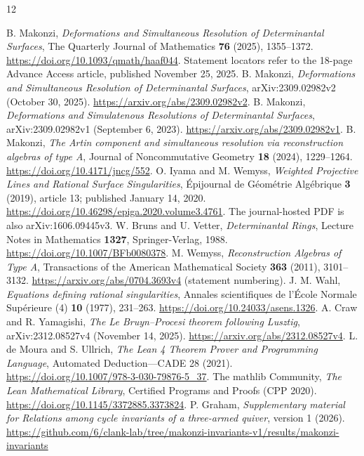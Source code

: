 \documentclass[11pt]{article}
\theoremstyle{remark}
\begin{document}
\begin{thebibliography}{12}
\small\raggedright
{}
B. Makonzi, \emph{Deformations and Simultaneous Resolution of Determinantal
Surfaces}, The Quarterly Journal of Mathematics \textbf{76} (2025),
1355--1372. \url{https://doi.org/10.1093/qmath/haaf044}.
Statement locators refer to the 18-page Advance Access article,
published November 25, 2025.
B. Makonzi, \emph{Deformations and Simultaneous Resolution of Determinantal
Surfaces}, arXiv:2309.02982v2 (October 30, 2025).
\url{https://arxiv.org/abs/2309.02982v2}.
B. Makonzi, \emph{Deformations and Simulatenous Resolutions of Determinantal
Surfaces}, arXiv:2309.02982v1 (September 6, 2023).
\url{https://arxiv.org/abs/2309.02982v1}.
B. Makonzi, \emph{The Artin component and simultaneous resolution via
reconstruction algebras of type A}, Journal of Noncommutative Geometry
\textbf{18} (2024), 1229--1264. \url{https://doi.org/10.4171/jncg/552}.
O. Iyama and M. Wemyss, \emph{Weighted Projective Lines and Rational Surface
Singularities}, \'{E}pijournal de G\'eom\'etrie Alg\'ebrique \textbf{3} (2019),
article 13; published January 14, 2020.
\url{https://doi.org/10.46298/epiga.2020.volume3.4761}.
The journal-hosted PDF is also arXiv:1606.09445v3.
W. Bruns and U. Vetter, \emph{Determinantal Rings}, Lecture Notes in
Mathematics \textbf{1327}, Springer-Verlag, 1988.
\url{https://doi.org/10.1007/BFb0080378}.
M. Wemyss, \emph{Reconstruction Algebras of Type A}, Transactions of the
American Mathematical Society \textbf{363} (2011), 3101--3132.
\url{https://arxiv.org/abs/0704.3693v4} (statement numbering).
J. M. Wahl, \emph{Equations defining rational singularities}, Annales
scientifiques de l'\'Ecole Normale Sup\'erieure (4) \textbf{10} (1977),
231--263. \url{https://doi.org/10.24033/asens.1326}.
A. Craw and R. Yamagishi, \emph{The Le Bruyn--Procesi theorem following
Lusztig}, arXiv:2312.08527v4 (November 14, 2025).
\url{https://arxiv.org/abs/2312.08527v4}.
L. de Moura and S. Ullrich, \emph{The Lean 4 Theorem Prover and Programming
Language}, Automated Deduction---CADE 28 (2021).
\url{https://doi.org/10.1007/978-3-030-79876-5_37}.
The mathlib Community, \emph{The Lean Mathematical Library},
Certified Programs and Proofs (CPP 2020).
\url{https://doi.org/10.1145/3372885.3373824}.
P. Graham, \emph{Supplementary material for Relations among cycle invariants
of a three-armed quiver}, version 1 (2026).
\url{https://github.com/6/clank-lab/tree/makonzi-invariants-v1/results/makonzi-invariants}
\end{thebibliography}
\end{document}
